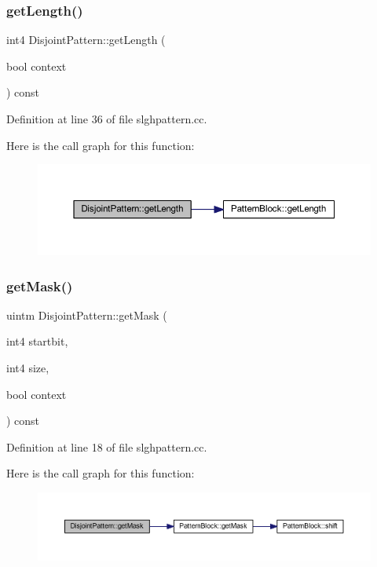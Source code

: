 \subsubsection{\texorpdfstring{getLength()}{getLength()}}
{\footnotesize\ttfamily int4 Disjoint\+Pattern\+::get\+Length (\begin{DoxyParamCaption}\item[{bool}]{context }\end{DoxyParamCaption}) const}



Definition at line 36 of file slghpattern.\+cc.

Here is the call graph for this function\+:
\nopagebreak
\begin{figure}[H]
\begin{center}
\leavevmode
\includegraphics[width=350pt]{class_disjoint_pattern_a639b88b6ca8eeb7c74562fded205c601_cgraph}
\end{center}
\end{figure}
\mbox{\label{class_disjoint_pattern_a1bf448ce92b901dbaaf43de07f88d64e}} 
\subsubsection{\texorpdfstring{getMask()}{getMask()}}
{\footnotesize\ttfamily uintm Disjoint\+Pattern\+::get\+Mask (\begin{DoxyParamCaption}\item[{int4}]{startbit,  }\item[{int4}]{size,  }\item[{bool}]{context }\end{DoxyParamCaption}) const}



Definition at line 18 of file slghpattern.\+cc.

Here is the call graph for this function\+:
\nopagebreak
\begin{figure}[H]
\begin{center}
\leavevmode
\includegraphics[width=350pt]{class_disjoint_pattern_a1bf448ce92b901dbaaf43de07f88d64e_cgraph}
\end{center}
\end{figure}
\mbox{\label{class_disjoint_pattern_aeaef820b4f6fdd9f5af67ee83cdc5a39}} 
